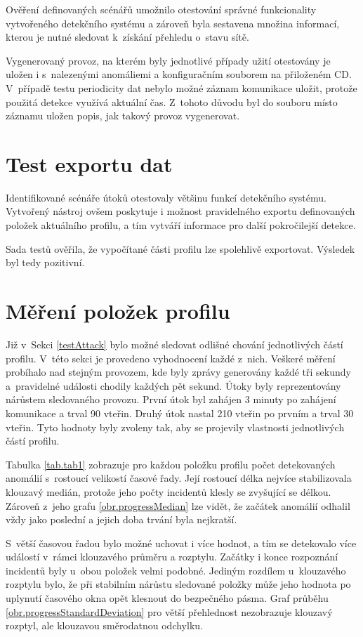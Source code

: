   Ověření definovaných scénářů umožnilo otestování správné funkcionality vytvořeného detekčního
  systému a zároveň byla sestavena množina informací, kterou je nutné sledovat k~získání 
  přehledu o~stavu sítě.
  
  Vygenerovaný provoz, na kterém byly jednotlivé případy užití otestovány je uložen i s~nalezenými
  anomáliemi a konfiguračním souborem na přiloženém CD. V~případě testu periodicity dat nebylo možné záznam 
  komunikace uložit, protože použitá detekce využívá aktuální čas. Z~tohoto důvodu 
  byl do souboru místo záznamu uložen popis, jak takový provoz vygenerovat.

\section{Test exportu dat}
Identifikované scénáře útoků otestovaly většinu funkcí detekčního systému. Vytvořený nástroj
ovšem poskytuje i možnost pravidelného exportu definovaných položek aktuálního profilu, a tím 
vytváří informace pro další pokročilejší detekce. 

Sada testů ověřila, že vypočítané části profilu lze spolehlivě exportovat. Výsledek byl tedy
pozitivní.

\section{Měření položek profilu}
Již v~Sekci \ref{testAttack} bylo možné sledovat odlišné chování 
jednotlivých částí profilu. V~této sekci je provedeno vyhodnocení každé z~nich. Veškeré 
měření probíhalo nad stejným provozem, kde byly zprávy generovány každé tři sekundy a~pravidelné
události chodily každých pět sekund. Útoky byly reprezentovány nárůstem sledovaného provozu.
První útok byl zahájen 3 minuty po zahájení komunikace a trval 90 vteřin. Druhý útok nastal 210
vteřin po prvním a trval 30 vteřin. Tyto hodnoty byly zvoleny tak, aby se projevily vlastnosti
jednotlivých částí profilu.

Tabulka \ref{tab.tab1} zobrazuje pro každou položku profilu počet detekovaných anomálií 
s~rostoucí velikostí časové řady. Její rostoucí délka nejvíce stabilizovala klouzavý medián,
protože jeho počty
incidentů klesly se zvyšující se délkou. Zároveň z~jeho grafu \ref{obr.progressMedian} lze vidět,
že začátek anomálií odhalil vždy jako poslední a jejich doba trvání byla nejkratší. 

S~větší časovou řadou bylo možné uchovat i více hodnot, a 
tím se detekovalo více událostí v~rámci klouzavého průměru a rozptylu. Začátky i konce rozpoznání incidentů
byly u~obou položek velmi podobné. Jediným rozdílem u~klouzavého rozptylu bylo, že při stabilním 
nárůstu sledované položky může jeho hodnota po uplynutí časového okna opět klesnout do bezpečného pásma. 
Graf průběhu \ref{obr.progressStandardDeviation} pro větší přehlednost nezobrazuje klouzavý rozptyl, ale 
klouzavou směrodatnou odchylku. 

